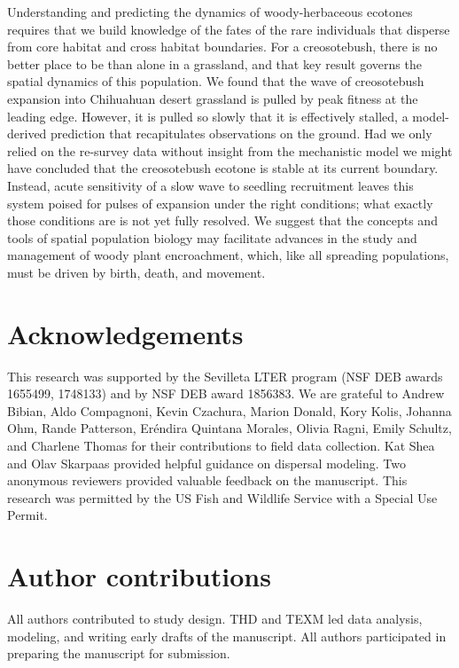 \documentclass[11pt]{article}\usepackage[]{graphicx}\usepackage[usenames,dvipsnames]{xcolor}
\begin{document}
Understanding and predicting the dynamics of woody-herbaceous ecotones requires that we build knowledge of the fates of the rare individuals that disperse from core habitat and cross habitat boundaries. 
For a creosotebush, there is no better place to be than alone in a grassland, and that key result governs the spatial dynamics of this population. 
We found that the wave of creosotebush expansion into Chihuahuan desert grassland is pulled by peak fitness at the leading edge.
However, it is pulled so slowly that it is effectively stalled, a model-derived prediction that recapitulates observations on the ground. 
Had we only relied on the re-survey data without insight from the mechanistic model we might have concluded that the creosotebush ecotone is stable at its current boundary.
Instead, acute sensitivity of a slow wave to seedling recruitment leaves this system poised for pulses of expansion under the right conditions; what exactly those conditions are is not yet fully resolved.
We suggest that the concepts and tools of spatial population biology may facilitate advances in the study and management of woody plant encroachment, which, like all spreading populations, must be driven by birth, death, and movement. 


\section*{Acknowledgements}
This research was supported by the Sevilleta LTER program (NSF DEB awards 1655499, 1748133) and by NSF DEB award 1856383.
We are grateful to Andrew Bibian, Aldo Compagnoni, Kevin Czachura, Marion Donald, Kory Kolis, Johanna Ohm, Rande Patterson, Er\'{e}ndira Quintana Morales, Olivia Ragni, Emily Schultz, and Charlene Thomas for their contributions to field data collection.
Kat Shea and Olav Skarpaas provided helpful guidance on dispersal modeling. 
Two anonymous reviewers provided valuable feedback on the manuscript. 
This research was permitted by the US Fish and Wildlife Service with a Special Use Permit.

\section*{Author contributions}
All authors contributed to study design. 
THD and TEXM led data analysis, modeling, and writing early drafts of the manuscript. 
All authors participated in preparing the manuscript for submission.
\end{document}
